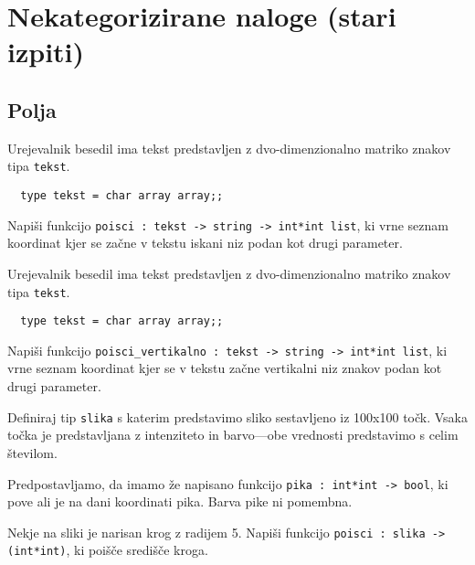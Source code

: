 \chapter[Nekategorizirano]{Nekategorizirane naloge (stari  izpiti)}

\section{Polja}

\begin{ex}
  Urejevalnik besedil ima tekst predstavljen z dvo-dimenzionalno
  matriko znakov tipa \texttt{tekst}.

  \begin{verbatim}
  type tekst = char array array;;
  \end{verbatim}

  Napi\v si funkcijo \texttt{poisci : tekst -> string -> int*int
    list}, ki vrne seznam koordinat kjer se začne v tekstu iskani niz
  podan kot drugi parameter. 


\end{ex} 
\begin{ex}
  Urejevalnik besedil ima tekst predstavljen z dvo-dimenzionalno
  matriko znakov tipa \texttt{tekst}.

  \begin{verbatim}
  type tekst = char array array;;
  \end{verbatim}

  Napi\v si funkcijo \texttt{poisci\_vertikalno : tekst -> string ->
    int*int list}, ki vrne seznam koordinat kjer se v tekstu za\v cne
  vertikalni niz znakov podan kot drugi parameter.


\end{ex} 
\begin{ex}
  Definiraj tip \texttt{slika} s katerim predstavimo sliko sestavljeno
  iz 100x100 to\v ck. Vsaka to\v cka je predstavljana z intenziteto in
  barvo---obe vrednosti predstavimo s celim \v stevilom.

  Predpostavljamo, da imamo \v ze napisano funkcijo \texttt{pika :
    int*int -> bool}, ki pove ali je na dani koordinati pika. Barva
  pike ni pomembna.

  Nekje na sliki je narisan krog z radijem 5. Napi\v si funkcijo
  \texttt{poisci : slika -> (int*int)}, ki poi\v s\v ce sredi\v s\v ce
  kroga.


\end{ex} 

